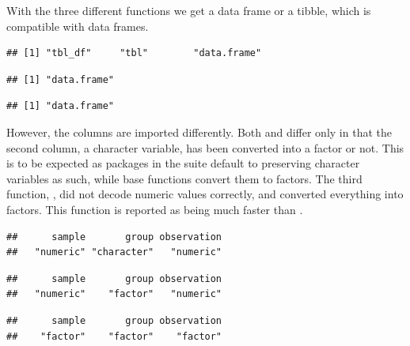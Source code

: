 \documentclass[krantz2]{krantz}\usepackage{knitr}%
\begin{document}
With the three different functions we get a data frame or a tibble, which is compatible with data frames.
\begin{knitrout}\footnotesize
{}\color{fgcolor}\begin{kframe}
\begin{alltt}
\end{alltt}
\begin{verbatim}
## [1] "tbl_df"     "tbl"        "data.frame"
\end{verbatim}
\begin{alltt}
\end{alltt}
\begin{verbatim}
## [1] "data.frame"
\end{verbatim}
\begin{alltt}
\end{alltt}
\begin{verbatim}
## [1] "data.frame"
\end{verbatim}
\end{kframe}
\end{knitrout}

However, the columns are imported differently. Both  and  differ only in that the second column, a character variable, has been converted into a factor or not. This is to be expected as packages in the  suite default to preserving character variables as such, while base \Rlang functions convert them to factors. The third function, , did not decode numeric values correctly, and converted everything into factors. This function is reported as being much faster than .
\begin{knitrout}\footnotesize
{}\color{fgcolor}\begin{kframe}
\begin{alltt}
\end{alltt}
\begin{verbatim}
##      sample       group observation 
##   "numeric" "character"   "numeric"
\end{verbatim}
\begin{alltt}
\end{alltt}
\begin{verbatim}
##      sample       group observation 
##   "numeric"    "factor"   "numeric"
\end{verbatim}
\begin{alltt}
\end{alltt}
\begin{verbatim}
##      sample       group observation 
##    "factor"    "factor"    "factor"
\end{verbatim}
\end{kframe}
\end{knitrout}
\end{document}
